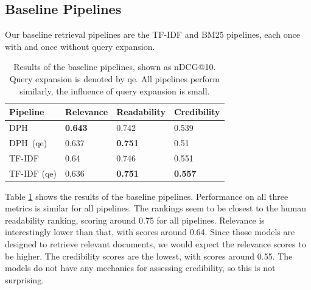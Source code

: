 \subsection{Baseline Pipelines}
Our baseline retrieval pipelines are the TF-IDF and BM25 pipelines, each once with and once without query expansion.
\begin{table}[tb]
\centering
\begin{tabularx}{\textwidth}{lXXX}
Pipeline    & Relevance          & Readability        & Credibility        \\ \hline
DPH         & \textbf{0.643} & 0.742 & 0.539 \\
DPH\ (qe)     & 0.637 & \textbf{0.751} & 0.51  \\
TF-IDF     & 0.64  & 0.746 & 0.551 \\
TF-IDF (qe) & 0.636 & \textbf{0.751} & \textbf{0.557}
\end{tabularx}
\caption{Results of the baseline pipelines, shown as nDCG@10. Query expansion is denoted by qe.
All pipelines perform similarly, the influence of query expansion is small.}
\label{tab:baseline_pipelines}
\end{table}
Table \ref{tab:baseline_pipelines} shows the results of the baseline pipelines.
Performance on all three metrics is similar for all pipelines.
The rankings seem to be closest to the human readability ranking, scoring around 0.75 for all pipelines.
Relevance is interestingly lower than that, with scores around 0.64.
Since those models are designed to retrieve relevant documents, we would expect the relevance scores to be higher.
The credibility scores are the lowest, with scores around 0.55.
The models do not have any mechanics for assessing credibility, so this is not surprising.

